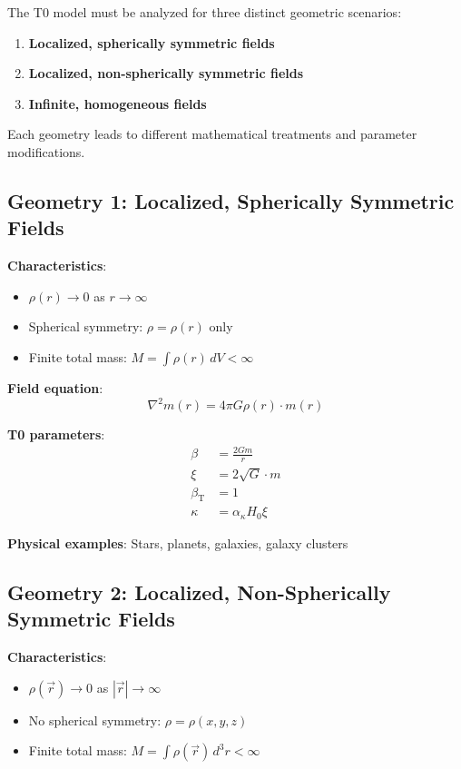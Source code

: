 \documentclass[12pt,a4paper]{article}
\newcommand{\betaT}{\beta_{\text{T}}}
\begin{document}
	The T0 model must be analyzed for three distinct geometric scenarios:
	
	\begin{enumerate}
		\item \textbf{Localized, spherically symmetric fields}
		\item \textbf{Localized, non-spherically symmetric fields} 
		\item \textbf{Infinite, homogeneous fields}
	\end{enumerate}
	
	Each geometry leads to different mathematical treatments and parameter modifications.
	
	\subsection{Geometry 1: Localized, Spherically Symmetric Fields}
	\label{subsec:geometry_localized_spherical}
	
	\textbf{Characteristics}:
	\begin{itemize}
		\item $\rho(r) \to 0$ as $r \to \infty$
		\item Spherical symmetry: $\rho = \rho(r)$ only
		\item Finite total mass: $M = \int \rho(r) \, dV < \infty$
	\end{itemize}
	
	\textbf{Field equation}:
	\begin{equation}
		\nabla^2 m(r) = 4\pi G \rho(r) \cdot m(r)
	\end{equation}
	
	\textbf{T0 parameters}:
	\begin{align}
		\beta &= \frac{2Gm}{r} \\
		\xi &= 2\sqrt{G} \cdot m \\
		\betaT &= 1 \\
		\kappa &= \alpha_\kappa H_0 \xi
	\end{align}
	
	\textbf{Physical examples}: Stars, planets, galaxies, galaxy clusters
	
	\subsection{Geometry 2: Localized, Non-Spherically Symmetric Fields}
	\label{subsec:geometry_localized_nonsphere}
	
	\textbf{Characteristics}:
	\begin{itemize}
		\item $\rho(\vec{r}) \to 0$ as $|\vec{r}| \to \infty$
		\item No spherical symmetry: $\rho = \rho(x,y,z)$
		\item Finite total mass: $M = \int \rho(\vec{r}) \, d^3r < \infty$
	\end{itemize}
	
\end{document}
